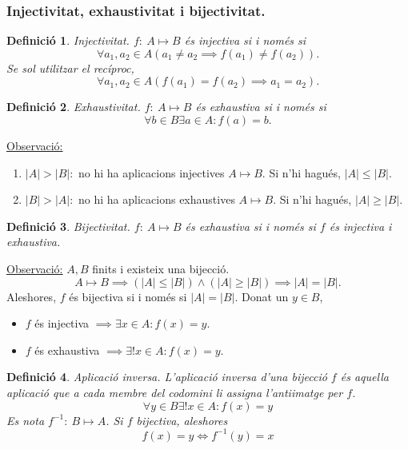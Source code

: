 \documentclass[11pt]{article}
\newcommand{\obs}{\underline{Observació:} }
\newtheorem{defi}{Definició}[section]
\begin{document}
\subsubsection{Injectivitat, exhaustivitat i bijectivitat.}
\begin{defi}
Injectivitat. $f: \ A\mapsto B$ és injectiva si i només si
$$\forall a_1,a_2\in A(a_1\neq a_2\implies f(a_1)\neq f(a_2)).$$
Se sol utilitzar el recíproc,
$$\forall a_1,a_2\in A(f(a_1)=f(a_2)\implies a_1=a_2).$$
\end{defi}
\begin{defi}
Exhaustivitat. $f: \ A\mapsto B$ és exhaustiva si i només si
$$\forall b\in B\exists a\in A:f(a)=b.$$
\end{defi}
\noindent\obs
\begin{enumerate}
\item $|A|>|B|:$ no hi ha aplicacions injectives $A\mapsto B$. Si n'hi hagués, $|A|\leq|B|$.
\item $|B|>|A|:$ no hi ha aplicacions exhaustives $A\mapsto B$. Si n'hi hagués, $|A|\geq|B|$.
\end{enumerate}
\begin{defi}
Bijectivitat.  $f: \ A\mapsto B$ és exhaustiva si i només si $f$ és injectiva i exhaustiva.
\end{defi}
\noindent\obs $A,B$ finits i existeix una bijecció.
$$A\mapsto B\implies (|A|\leq|B|)\wedge (|A|\geq|B|)\implies |A|=|B|.$$
Aleshores, $f$ és bijectiva si i només si $|A|=|B|$. Donat un $y\in B$,
\begin{itemize}
\item $f$ és injectiva $\implies\exists x\in A:f(x)=y.$
\item $f$ és exhaustiva $\implies\exists!x\in A:f(x)=y.$
\end{itemize}
\begin{defi}
Aplicació inversa. L'aplicació inversa d'una bijecció $f$ és aquella aplicació que a cada membre del codomini li assigna l'antiimatge per $f$.
$$\forall y\in B\exists!x\in A:f(x)=y$$
Es nota $f^{-1}: \ B\mapsto A$. Si $f$ bijectiva, aleshores
$$f(x)=y\iff f^{-1}(y)=x$$
\end{defi}
\end{document}
